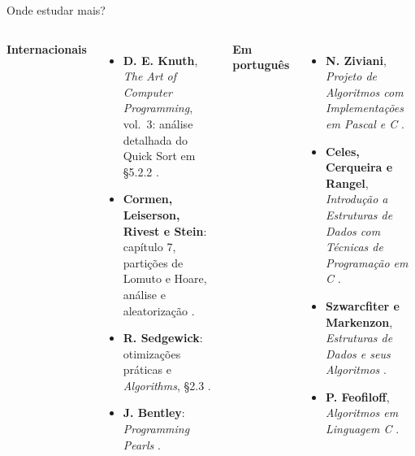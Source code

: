 \documentclass[aspectratio=169,10pt]{beamer}
\begin{document}
\begin{frame}{Onde estudar mais?}
 \begin{columns}[T]
   \footnotesize
   \textbf{Internacionais}
   \begin{itemize}
    \item \textbf{D. E. Knuth}, \emph{The Art of Computer Programming}, vol.\ 3: análise detalhada do Quick Sort em \S5.2.2 \cite{knuth98}.
    \item \textbf{Cormen, Leiserson, Rivest e Stein}: capítulo 7, partições de Lomuto e Hoare, análise e aleatorização \cite{clrs22}.
    \item \textbf{R. Sedgewick}: otimizações práticas \cite{sedgewick78} e \emph{Algorithms}, \S2.3 \cite{sedgewick11}.
    \item \textbf{J. Bentley}: \emph{Programming Pearls} \cite{bentley00}.
   \end{itemize}
   \footnotesize
   \textbf{Em português}
   \begin{itemize}
    \item \textbf{N. Ziviani}, \emph{Projeto de Algoritmos com Implementações em Pascal e C} \cite{ziviani10}.
    \item \textbf{Celes, Cerqueira e Rangel}, \emph{Introdução a Estruturas de Dados com Técnicas de Programação em C} \cite{celes17}.
    \item \textbf{Szwarcfiter e Markenzon}, \emph{Estruturas de Dados e seus Algoritmos} \cite{szwarcfiter10}.
    \item \textbf{P. Feofiloff}, \emph{Algoritmos em Linguagem C} \cite{feofiloff09}.
   \end{itemize}
 \end{columns}
\end{frame}
\end{document}
